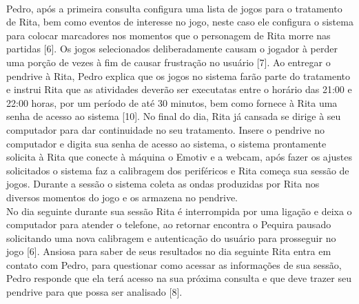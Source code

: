 \documentclass[12pt]{article}
\begin{document}
\paragraph{} 
Pedro, após a primeira consulta configura uma lista de jogos para o tratamento de Rita, bem como eventos de interesse no jogo, neste caso ele configura o sistema para colocar marcadores nos momentos que o personagem de Rita morre nas partidas [6]. Os jogos selecionados deliberadamente causam o jogador à perder uma porção de vezes à fim de causar frustração no usuário [7]. Ao entregar o pendrive à Rita, Pedro explica que os jogos no sistema farão parte do tratamento e instrui Rita que as atividades deverão ser executatas entre o horário das 21:00 e 22:00 horas, por um período de até 30 minutos, bem como fornece à Rita uma senha de acesso ao sistema [10].
No final do dia, Rita já cansada se dirige à seu computador para dar continuidade no seu tratamento. Insere o pendrive no computador e digita sua senha de acesso ao sistema, o sistema prontamente solicita à Rita que conecte à máquina o Emotiv e a webcam, após fazer os ajustes solicitados o sistema faz a calibragem dos periféricos e Rita começa sua sessão de jogos. Durante a sessão o sistema coleta as ondas produzidas por Rita nos diversos momentos do jogo e os armazena no pendrive. \\
No dia seguinte durante sua sessão Rita é interrompida por uma ligação e deixa o computador para atender o telefone, ao retornar encontra o Pequira pausado solicitando uma nova calibragem e autenticação do usuário para prosseguir no jogo [6]. Ansiosa para saber de seus resultados no dia seguinte Rita entra em contato com Pedro, para questionar como acessar as informações de sua sessão, Pedro responde que ela terá acesso na sua próxima consulta e que deve trazer seu pendrive para que possa ser analisado [8].
\end{document}
